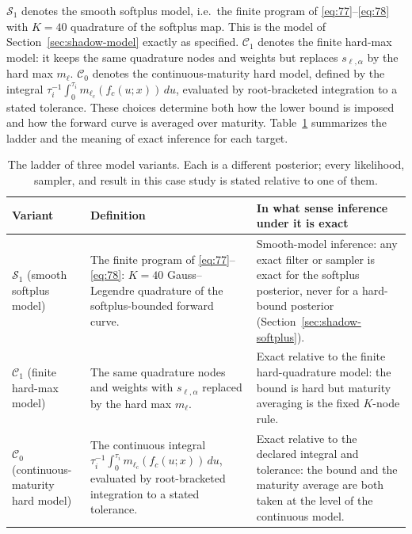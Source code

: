 \documentclass[11pt]{article}
\begin{document}
\(\mathcal S_1\) denotes the smooth softplus model, i.e.\ the finite program of \eqref{eq:77}--\eqref{eq:78} with \(K=40\) quadrature of the softplus map. This is the model of Section~\ref{sec:shadow-model} exactly as specified. \(\mathcal C_1\) denotes the finite hard-max model: it keeps the same quadrature nodes and weights but replaces \(s_{\ell,\alpha}\) by the hard max \(m_\ell\). \(\mathcal C_0\) denotes the continuous-maturity hard model, defined by the integral \(\tau_i^{-1}\int_0^{\tau_i} m_{\ell_c}(f_c(u;x))\,du\), evaluated by root-bracketed integration to a stated tolerance. These choices determine both how the lower bound is imposed and how the forward curve is averaged over maturity. Table~\ref{tab:ladder} summarizes the ladder and the meaning of exact inference for each target.

\begin{table}[htbp]\small
\begin{tabularx}{\textwidth}{@{}>{\raggedright\arraybackslash}p{}XX@{}}
\toprule
Variant & Definition & In what sense inference under it is exact \\
\midrule
\(\mathcal S_1\) (smooth softplus model) &
The finite program of \eqref{eq:77}--\eqref{eq:78}: \(K=40\)
Gauss--Legendre quadrature of the softplus-bounded forward curve. &
Smooth-model inference: any exact filter or sampler is exact for the
softplus posterior, never for a hard-bound posterior
(Section~\ref{sec:shadow-softplus}). \\
\(\mathcal C_1\) (finite hard-max model) &
The same quadrature nodes and weights with \(s_{\ell,\alpha}\)
replaced by the hard max \(m_\ell\). &
Exact relative to the finite hard-quadrature model: the bound is hard
but maturity averaging is the fixed \(K\)-node rule. \\
\(\mathcal C_0\) (continuous-maturity hard model) &
The continuous integral
\(\tau_i^{-1}\int_0^{\tau_i} m_{\ell_c}(f_c(u;x))\,du\), evaluated by
root-bracketed integration to a stated tolerance. &
Exact relative to the declared integral and tolerance: the bound and
the maturity average are both taken at the level of the continuous
model. \\
\bottomrule
\end{tabularx}
\caption{The ladder of three model variants. Each is a different
posterior; every likelihood, sampler, and result in this case study is
stated relative to one of them.}\label{tab:ladder}
\end{table}
\end{document}
